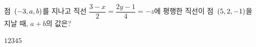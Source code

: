 점~$(-3{,}\mkern3mu\mathopen{}a{,}\mkern3mu\mathopen{}b)$를 지나고 직선 $\dfrac{3-x}{2}=\dfrac{2y-1}{4}=-z$에 평행한 직선이 점~$(5{,}\mkern3mu\mathopen{}2{,}\mkern3mu\mathopen{}-1)$을 지날 때, $a+b$의 값은?
\begin{choices32}{$1$}{$2$}{$3$}{$4$}{$5$}\end{choices32}
